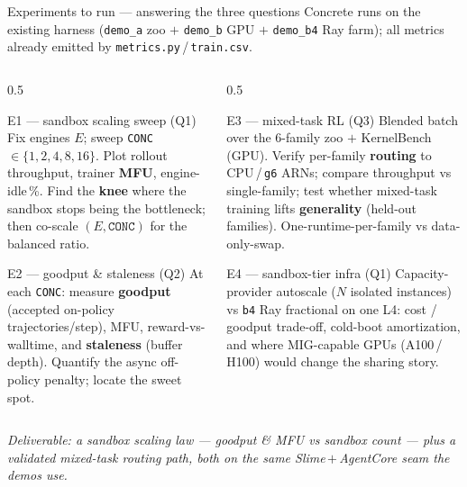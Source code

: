 \documentclass[aspectratio=169]{beamer}
\begin{document}
\begin{frame}{Experiments to run --- answering the three questions}
  \footnotesize Concrete runs on the existing harness (\texttt{demo\_a} zoo $+$ \texttt{demo\_b} GPU $+$
  \texttt{demo\_b4} Ray farm); all metrics already emitted by \texttt{metrics.py}\,/\,\texttt{train.csv}.
  \begin{columns}[T]
    \begin{column}{0.5\textwidth}
      \begin{block}{E1 --- sandbox scaling sweep (Q1)}
        \scriptsize Fix engines $E$; sweep \texttt{CONC}\,$\in\{1,2,4,8,16\}$. Plot rollout throughput,
        trainer \textbf{MFU}, engine-idle\,\%. Find the \textbf{knee} where the sandbox stops being the
        bottleneck; then co-scale $(E,\texttt{CONC})$ for the balanced ratio.
      \end{block}
      \begin{block}{E2 --- goodput \& staleness (Q2)}
        \scriptsize At each \texttt{CONC}: measure \textbf{goodput} (accepted on-policy trajectories/step),
        MFU, reward-vs-walltime, and \textbf{staleness} (buffer depth). Quantify the async off-policy
        penalty; locate the sweet spot.
      \end{block}
    \end{column}
    \begin{column}{0.5\textwidth}
      \begin{block}{E3 --- mixed-task RL (Q3)}
        \scriptsize Blended batch over the 6-family zoo $+$ KernelBench (GPU). Verify per-family
        \textbf{routing} to CPU\,/\,\texttt{g6} ARNs; compare throughput vs single-family; test whether
        mixed-task training lifts \textbf{generality} (held-out families). One-runtime-per-family vs
        data-only-swap.
      \end{block}
      \begin{block}{E4 --- sandbox-tier infra (Q1)}
        \scriptsize Capacity-provider autoscale ($N$ isolated instances) vs \texttt{b4} Ray fractional on
        one L4: cost / goodput trade-off, cold-boot amortization, and where MIG-capable GPUs
        (A100\,/\,H100) would change the sharing story.
      \end{block}
    \end{column}
  \end{columns}
  \vspace{0.1em}
  {\scriptsize\itshape Deliverable: a \emph{sandbox scaling law} --- goodput \& MFU vs sandbox count ---
  plus a validated mixed-task routing path, both on the same Slime\,$+$\,AgentCore seam the demos use.}
\end{frame}
\end{document}
